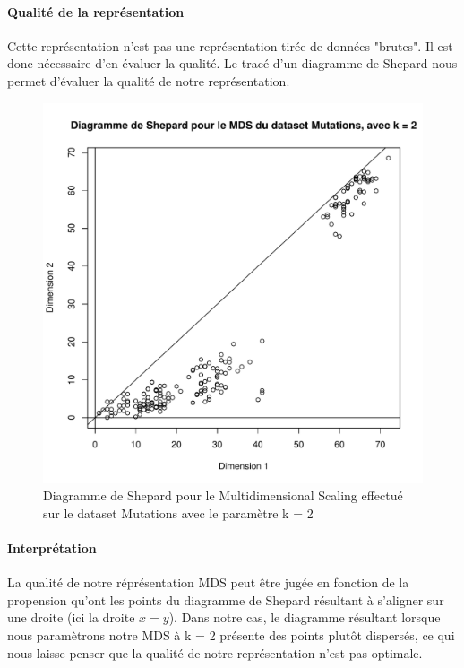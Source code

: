 \documentclass{report}
\begin{document}
\paragraph{Qualité de la représentation}
Cette représentation n'est pas une représentation tirée de données "brutes". Il est donc nécessaire d'en évaluer la qualité. Le tracé d'un diagramme de Shepard nous permet d'évaluer la qualité de notre représentation.
\begin{figure}[ht!]
\begin{center}
    \includegraphics[width=\textwidth]{../plots/E1Q3_SHEPm.pdf}
    \caption{Diagramme de Shepard pour le Multidimensional Scaling effectué sur le dataset Mutations avec le paramètre k = 2}
\end{center}
\end{figure}
\paragraph{Interprétation}
La qualité de notre réprésentation MDS peut être jugée en fonction de la propension qu'ont les points du diagramme de Shepard résultant à s'aligner sur une droite (ici la droite $x = y$). Dans notre cas, le diagramme résultant lorsque nous paramètrons notre MDS à k = 2 présente des points plutôt dispersés, ce qui nous laisse penser que la qualité de notre représentation n'est pas optimale.
\end{document}
